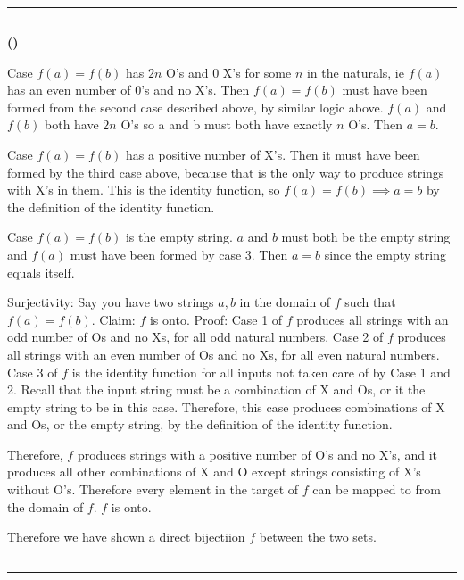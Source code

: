 \documentclass[11pt]{article}
\newcounter{questionCounter}
\newcounter{partCounter}[questionCounter]
\newenvironment{question}[2][\arabic{questionCounter}]{%
    \setcounter{partCounter}{0}%
    \vspace{.25in} \hrule \vspace{0.5em}%
        \noindent{\bf #2}%
    \vspace{0.8em} \hrule \vspace{.10in}%
    \addtocounter{questionCounter}{1}%
}{}
\renewenvironment{part}[1][\alph{partCounter}]{%
    \addtocounter{partCounter}{1}%
    \vspace{.10in}%
    \begin{indented}%
       {\bf (#1)} %
}{\end{indented}}
\begin{document}
\begin{question}{Hope and Comfort}
\begin{part}
Case $f(a)=f(b)$ has $2n$ O's and 0 X's for some $n$ in the naturals, ie $f(a)$ has an even number of 0's and no X's.
Then $f(a)=f(b)$ must have been formed from the second case described above, by similar logic above. $f(a)$ and $f(b)$ both
have $2n$ O's so a and b must both have exactly $n$ O's. Then $a=b$.

Case $f(a)=f(b)$ has a positive number of X's. Then it must have been formed by the third case above, because 
that is the only way to produce strings with X's in them. This is the identity function, so $f(a)=f(b) \implies a=b$ by
the definition of the identity function.

Case $f(a)=f(b)$ is the empty string. $a$ and $b$ must both be the empty string and $f(a)$ must have been formed by case 3. Then
$a=b$ since the empty string equals itself.

Surjectivity:
Say you have two strings $a,b$ in the domain of $f$ such that $f(a) = f(b)$.
Claim: $f$ is onto. 
Proof: 
Case 1 of $f$ produces all strings with an odd number of Os and no Xs, for all odd natural numbers.
Case 2 of $f$ produces all strings with an even number of Os and no Xs, for all even natural numbers.
Case 3 of $f$ is the identity function for all inputs not taken care of by Case 1 and 2. 
Recall that the input string must be a combination of X and Os, or it the empty string to be in this case.
Therefore, this case produces combinations of X and Os, or the empty string, by the definition of the 
identity function.

Therefore, $f$ produces strings with a positive number of O's and no X's, and it produces all other combinations
of X and O except strings consisting of X's without O's. Therefore every element in the target of $f$ can be mapped to from the domain of $f$. 
$f$ is onto.

Therefore we have shown a direct bijectiion $f$ between the two sets.
\end{part}
\end{question}
\begin{question}{Patience}
\end{question}
\end{document}
